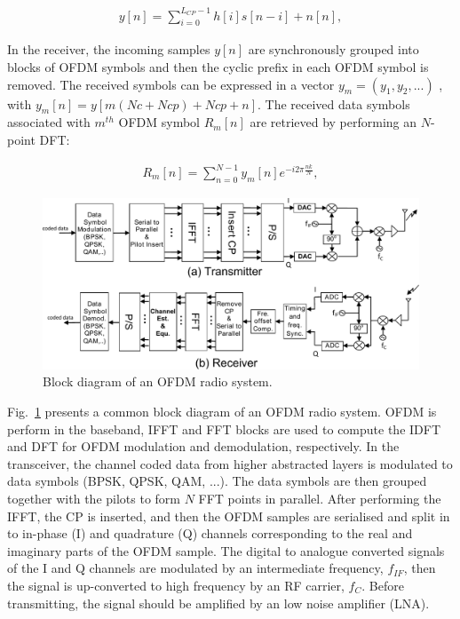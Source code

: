 \begin{eqnarray}
\label{equ:OFDMchannelsignal}
y[n] =  \sum_{i=0}^{L_{CP}-1} h[i]s[n-i] + n[n],
\end{eqnarray}

In the receiver, the incoming samples $y[n]$ are synchronously grouped into blocks of OFDM symbols and then the cyclic prefix in each OFDM symbol is removed.
The received symbols can be expressed in a vector $y_{m} = (y_{1}, y_{2}, . . . )$ , with $y_{m}[n]=y[m(Nc+Ncp)+Ncp +n]$.
The received data symbols associated with $m^{th}$ OFDM symbol $R_{m}[n]$ are retrieved by performing an $N$-point DFT:

\begin{eqnarray}
\label{equ:receiveOFDMsymbol}
R_{m}[n] =  \sum_{n=0}^{N-1} y_{m}[n]e^{-i2\pi \frac{nk}{N}},
\end{eqnarray}

\begin{figure}
	\centerline{\includegraphics [width=0.8\columnwidth] {Figures/OFDM-block.pdf} }
	\caption{Block diagram of an OFDM radio system.}
	\label{fig:OFDM-block}
\end{figure}

Fig.~\ref{fig:OFDM-block} presents a common block diagram of an OFDM radio system.
OFDM is perform in the baseband, IFFT and FFT blocks are used to compute the IDFT and DFT for OFDM modulation and demodulation, respectively.
In the transceiver, the channel coded data from higher abstracted layers is modulated to data symbols (BPSK, QPSK, QAM, ...). The data symbols are then grouped together with the pilots to form $N$ FFT points in parallel.
After performing the IFFT, the CP is inserted, and then the OFDM samples are serialised and split in to in-phase (I) and quadrature (Q) channels corresponding to the real and imaginary parts of  the OFDM sample.
The digital to analogue converted signals of the I and Q channels are modulated by an intermediate frequency, $f_{IF}$, then the signal is up-converted to high frequency by an RF carrier, $f_{C}$.
Before transmitting, the signal should be amplified by an low noise amplifier (LNA).

